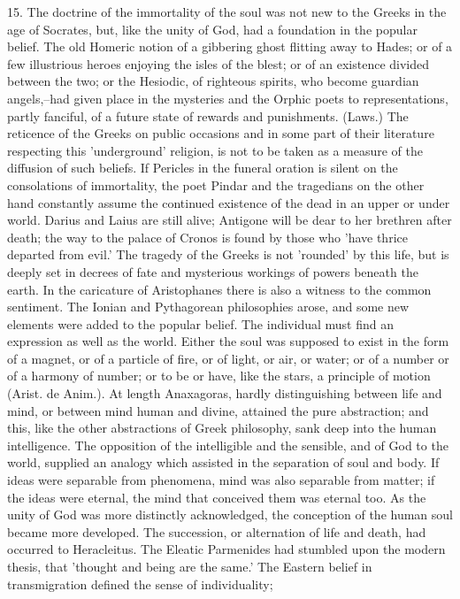 15. The doctrine of the immortality of the soul was not new to the
Greeks in the age of Socrates, but, like the unity of God, had a
foundation in the popular belief. The old Homeric notion of a gibbering
ghost flitting away to Hades; or of a few illustrious heroes enjoying
the isles of the blest; or of an existence divided between the two; or
the Hesiodic, of righteous spirits, who become guardian angels,--had
given place in the mysteries and the Orphic poets to representations,
partly fanciful, of a future state of rewards and punishments. (Laws.)
The reticence of the Greeks on public occasions and in some part of
their literature respecting this 'underground' religion, is not to be
taken as a measure of the diffusion of such beliefs. If Pericles in the
funeral oration is silent on the consolations of immortality, the
poet Pindar and the tragedians on the other hand constantly assume the
continued existence of the dead in an upper or under world. Darius
and Laius are still alive; Antigone will be dear to her brethren after
death; the way to the palace of Cronos is found by those who 'have
thrice departed from evil.' The tragedy of the Greeks is not 'rounded'
by this life, but is deeply set in decrees of fate and mysterious
workings of powers beneath the earth. In the caricature of Aristophanes
there is also a witness to the common sentiment. The Ionian and
Pythagorean philosophies arose, and some new elements were added to the
popular belief. The individual must find an expression as well as the
world. Either the soul was supposed to exist in the form of a magnet, or
of a particle of fire, or of light, or air, or water; or of a number or
of a harmony of number; or to be or have, like the stars, a principle
of motion (Arist. de Anim.). At length Anaxagoras, hardly distinguishing
between life and mind, or between mind human and divine, attained
the pure abstraction; and this, like the other abstractions of Greek
philosophy, sank deep into the human intelligence. The opposition of
the intelligible and the sensible, and of God to the world, supplied an
analogy which assisted in the separation of soul and body. If ideas were
separable from phenomena, mind was also separable from matter; if the
ideas were eternal, the mind that conceived them was eternal too. As
the unity of God was more distinctly acknowledged, the conception of the
human soul became more developed. The succession, or alternation of
life and death, had occurred to Heracleitus. The Eleatic Parmenides had
stumbled upon the modern thesis, that 'thought and being are the same.'
The Eastern belief in transmigration defined the sense of individuality;
